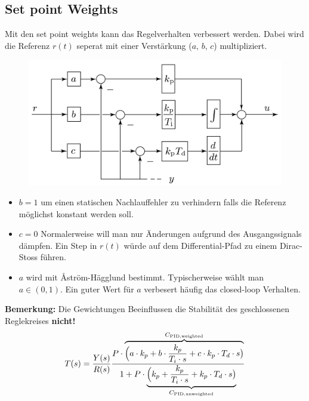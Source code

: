 \subsection{Set point Weights}
        Mit den set point weights kann das Regelverhalten verbessert werden. Dabei wird die Referenz $r(t)$ seperat mit einer Verstärkung ($a,\, b,\, c$) multipliziert.
        
        \begin{figure}[H]
            \centering
            \includegraphics[width = 0.5\linewidth]{images/04/spw.jpeg}
        \end{figure}
        
        \begin{itemize}
            \item $b=1$ um einen statischen Nachlauffehler zu verhindern falls die Referenz möglichst konstant werden soll.
            
            \item $c=0$ Normalerweise will man nur Änderungen aufgrund des Ausgangssignals dämpfen. Ein Step in $r(t)$ würde auf dem Differential-Pfad zu einem Dirac-Stoss führen.
            
            \item $a$ wird mit \r{A}ström-Hägglund bestimmt. Typischerweise wählt man $a\in(0,1)$. Ein guter Wert für $a$ verbesert häufig das closed-loop Verhalten.
        \end{itemize}
        \textbf{Bemerkung:} Die Gewichtungen Beeinflussen die Stabilität des geschlossenen Reglekreises \textbf{nicht!}
        \begin{equation*}
            T(s) = \frac{Y(s)}{R(s)}\frac{P\cdot\overbrace{\Big(a\cdot k_p +b\cdot\frac{k_p}{T_i\cdot s} + c\cdot k_p\cdot T_d\cdot s\big)}^{C_{\textnormal{PID,weighted}}}}{1 + P\cdot\underbrace{\Big(k_p + \frac{k_p}{T_i\cdot s} + k_p\cdot T_d\cdot s\big)}_{C_{\textnormal{PID,unweighted}}}}
        \end{equation*}